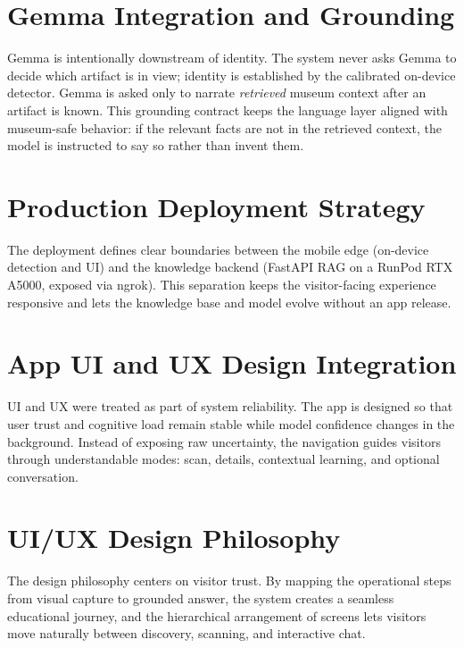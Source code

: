 \section{Gemma Integration and Grounding}

Gemma is intentionally downstream of identity. The system never asks Gemma to decide
which artifact is in view; identity is established by the calibrated on-device
detector. Gemma is asked only to narrate \emph{retrieved} museum context after an
artifact is known. This grounding contract keeps the language layer aligned with
museum-safe behavior: if the relevant facts are not in the retrieved context, the
model is instructed to say so rather than invent them.

\section{Production Deployment Strategy}

The deployment defines clear boundaries between the mobile edge (on-device detection
and UI) and the knowledge backend (FastAPI RAG on a RunPod RTX A5000, exposed via ngrok).
This separation keeps the visitor-facing experience responsive and lets the knowledge
base and model evolve without an app release.

\section{App UI and UX Design Integration}

UI and UX were treated as part of system reliability. The app is designed so that user
trust and cognitive load remain stable while model confidence changes in the
background. Instead of exposing raw uncertainty, the navigation guides visitors through
understandable modes: scan, details, contextual learning, and optional conversation.

\section{UI/UX Design Philosophy}

The design philosophy centers on visitor trust. By mapping the operational steps from
visual capture to grounded answer, the system creates a seamless educational journey,
and the hierarchical arrangement of screens lets visitors move naturally between
discovery, scanning, and interactive chat.
